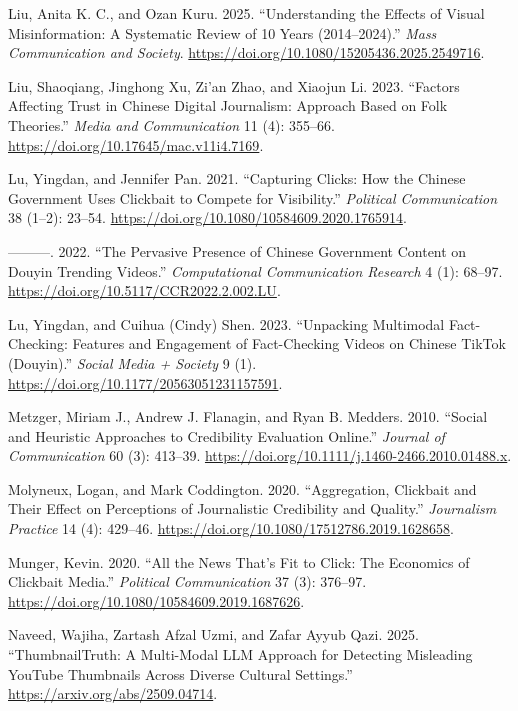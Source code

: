 \documentclass[
  12pt,
]{article}
\newlength{\cslhangindent}
\newenvironment{CSLReferences}[2] %
 {\begin{list}{}{%
  \setlength{\itemindent}{0pt}
  \setlength{\leftmargin}{0pt}
  \setlength{\parsep}{0pt}
  \ifodd #1
   \setlength{\leftmargin}{\cslhangindent}
   \setlength{\itemindent}{-1\cslhangindent}
  \fi
  \setlength{\itemsep}{#2\baselineskip}}}
 {\end{list}}
\begin{document}
\begin{CSLReferences}{1}{0}
Liu, Anita K. C., and Ozan Kuru. 2025. {``Understanding the Effects of
Visual Misinformation: A Systematic Review of 10 Years (2014--2024).''}
\emph{Mass Communication and Society}.
\url{https://doi.org/10.1080/15205436.2025.2549716}.

Liu, Shaoqiang, Jinghong Xu, Zi'an Zhao, and Xiaojun Li. 2023.
{``Factors Affecting Trust in {Chinese} Digital Journalism: Approach
Based on Folk Theories.''} \emph{Media and Communication} 11 (4):
355--66. \url{https://doi.org/10.17645/mac.v11i4.7169}.

Lu, Yingdan, and Jennifer Pan. 2021. {``Capturing Clicks: How the
{Chinese} Government Uses Clickbait to Compete for Visibility.''}
\emph{Political Communication} 38 (1--2): 23--54.
\url{https://doi.org/10.1080/10584609.2020.1765914}.

---------. 2022. {``The Pervasive Presence of {Chinese} Government
Content on {Douyin} Trending Videos.''} \emph{Computational
Communication Research} 4 (1): 68--97.
\url{https://doi.org/10.5117/CCR2022.2.002.LU}.

Lu, Yingdan, and Cuihua (Cindy) Shen. 2023. {``Unpacking Multimodal
Fact-Checking: Features and Engagement of Fact-Checking Videos on
{Chinese} {TikTok} ({Douyin}).''} \emph{Social Media + Society} 9 (1).
\url{https://doi.org/10.1177/20563051231157591}.

Metzger, Miriam J., Andrew J. Flanagin, and Ryan B. Medders. 2010.
{``Social and Heuristic Approaches to Credibility Evaluation Online.''}
\emph{Journal of Communication} 60 (3): 413--39.
\url{https://doi.org/10.1111/j.1460-2466.2010.01488.x}.

Molyneux, Logan, and Mark Coddington. 2020. {``Aggregation, Clickbait
and Their Effect on Perceptions of Journalistic Credibility and
Quality.''} \emph{Journalism Practice} 14 (4): 429--46.
\url{https://doi.org/10.1080/17512786.2019.1628658}.

Munger, Kevin. 2020. {``All the News That's Fit to Click: The Economics
of Clickbait Media.''} \emph{Political Communication} 37 (3): 376--97.
\url{https://doi.org/10.1080/10584609.2019.1687626}.

Naveed, Wajiha, Zartash Afzal Uzmi, and Zafar Ayyub Qazi. 2025.
{``{ThumbnailTruth}: A Multi-Modal {LLM} Approach for Detecting
Misleading {YouTube} Thumbnails Across Diverse Cultural Settings.''}
\url{https://arxiv.org/abs/2509.04714}.


\end{CSLReferences}
\end{document}
